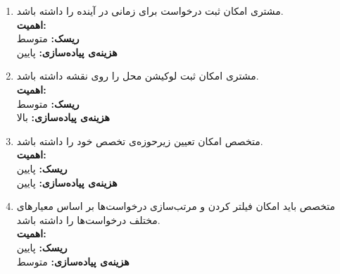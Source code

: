 \begin{enumerate}
		\item
	مشتری امکان ثبت درخواست برای زمانی در آینده را داشته باشد.
	\\
	\textbf{اهمیت:} 
	\\
	\textbf{ریسک:} متوسط
	\\
	\textbf{هزینه‌ی پیاده‌سازی:} پایین
			\item
	مشتری امکان ثبت لوکیشن محل را روی نقشه داشته باشد.
	\\
	\textbf{اهمیت:} 
	\\
	\textbf{ریسک:} متوسط
	\\
	\textbf{هزینه‌ی پیاده‌سازی:} بالا
	
		\item
متخصص امکان تعیین زیرحوزه‌ی تخصص خود را داشته باشد.
	\\
	\textbf{اهمیت:} 
	\\
	\textbf{ریسک:} پایین
	\\
	\textbf{هزینه‌ی پیاده‌سازی:} پایین
	\item
متخصص باید امکان فیلتر کردن و مرتب‌سازی درخواست‌ها بر اساس معیارهای مختلف درخواست‌ها را داشته باشد.
	\\
	\textbf{اهمیت:} 
	\\
	\textbf{ریسک:} پایین
	\\
	\textbf{هزینه‌ی پیاده‌سازی:} متوسط
	
\end{enumerate}


